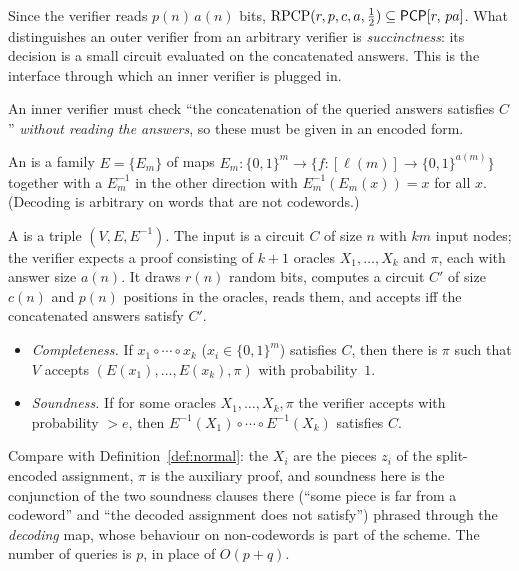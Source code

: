 \noindent
Since the verifier reads $p(n)\,a(n)$ bits, $\mathrm{RPCP}(r,p,c,a,\tfrac12)\subseteq\mathsf{PCP}[r,\,pa]$.  What distinguishes an outer verifier from an arbitrary verifier is
\emph{succinctness}: its decision is a small circuit evaluated on the concatenated answers.  This is the interface through which an inner verifier is plugged in.

An inner verifier must check ``the concatenation of the queried answers satisfies $C$'' \emph{without reading the answers}, so these must be given in an encoded form.

\begin{definition}\label{def:enc}
An  is a family $E=\{E_m\}$ of maps $E_m\colon\{0,1\}^m\to\{f\colon[\ell(m)]\to\{0,1\}^{a(m)}\}$ together with a
 $E^{-1}_m$ in the other direction with $E^{-1}_m(E_m(x))=x$ for all $x$.  (Decoding is arbitrary on words that are not codewords.)
\end{definition}

\begin{definition}\label{def:inner}
A  is a triple $(V,E,E^{-1})$.  The input is a circuit $C$ of size $n$ with $km$ input nodes; the verifier expects a proof
consisting of $k+1$ oracles $X_1,\dots,X_k$ and $\pi$, each with answer size $a(n)$.  It draws $r(n)$ random bits, computes a circuit $C'$ of size $c(n)$ and
$p(n)$ positions in the oracles, reads them, and accepts iff the concatenated answers satisfy $C'$.
\begin{itemize}
  \item \emph{Completeness.}  If $x_1\circ\cdots\circ x_k$ ($x_i\in\{0,1\}^m$) satisfies $C$, then there is $\pi$ such that $V$ accepts $(E(x_1),\dots,E(x_k),\pi)$ with probability~$1$.
  \item \emph{Soundness.}  If for some oracles $X_1,\dots,X_k,\pi$ the verifier accepts with probability $>e$, then $E^{-1}(X_1)\circ\cdots\circ E^{-1}(X_k)$ satisfies $C$.
\end{itemize}
\end{definition}

\noindent
Compare with Definition~\ref{def:normal}: the $X_i$ are the pieces $z_i$ of the split-encoded assignment, $\pi$ is the auxiliary proof, and soundness here is the
conjunction of the two soundness clauses there (``some piece is far from a codeword'' and ``the decoded assignment does not satisfy'') phrased through the \emph{decoding} map, whose behaviour on non-codewords is
part of the scheme.  The number of queries is $p$, in place of $O(p+q)$.

